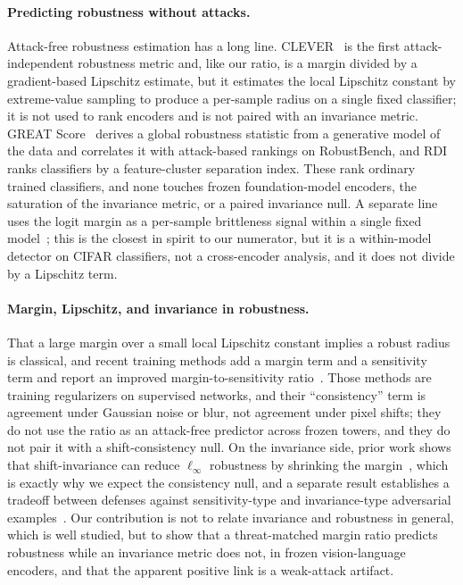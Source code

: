 \documentclass{article}
\begin{document}
\paragraph{Predicting robustness without attacks.}
Attack-free robustness estimation has a long line. CLEVER~\citep{clever} is the first attack-independent
robustness metric and, like our ratio, is a margin divided by a gradient-based Lipschitz estimate, but
it estimates the local Lipschitz constant by extreme-value sampling to produce a per-sample radius on a
single fixed classifier; it is not used to rank encoders and is not paired with an invariance metric.
GREAT Score~\citep{greatscore} derives a global robustness statistic from a generative model of the data
and correlates it with attack-based rankings on RobustBench, and RDI~\citep{rdi} ranks classifiers by a
feature-cluster separation index. These rank ordinary trained classifiers, and none touches frozen
foundation-model encoders, the saturation of the invariance metric, or a paired invariance null. A
separate line uses the logit margin as a per-sample brittleness signal within a single fixed
model~\citep{ngnawe}; this is the closest in spirit to our numerator, but it is a within-model detector
on CIFAR classifiers, not a cross-encoder analysis, and it does not divide by a Lipschitz term.

\paragraph{Margin, Lipschitz, and invariance in robustness.}
That a large margin over a small local Lipschitz constant implies a robust radius is classical, and
recent training methods add a margin term and a sensitivity term and report an improved
margin-to-sensitivity ratio~\citep{macs}. Those methods are training regularizers on supervised networks, and their
``consistency'' term is agreement under Gaussian noise or blur, not agreement under pixel shifts; they
do not use the ratio as an attack-free predictor across frozen towers, and they do not pair it with a
shift-consistency null. On the invariance side, prior work shows that shift-invariance can reduce
$\ell_\infty$ robustness by shrinking the margin~\citep{singlage}, which is exactly why we expect the consistency null,
and a separate result establishes a tradeoff between defenses against sensitivity-type and
invariance-type adversarial examples~\citep{tramer}. Our contribution is not to relate invariance and robustness in
general, which is well studied, but to show that a threat-matched margin ratio predicts robustness
while an invariance metric does not, in frozen vision-language encoders, and that
the apparent positive link is a weak-attack artifact.
\end{document}
